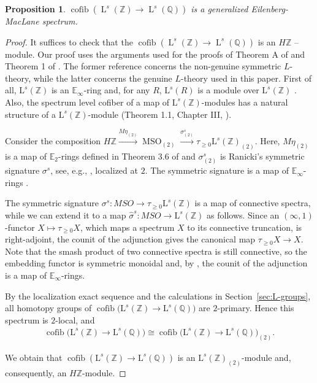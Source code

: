\documentclass[sn-mathphys-num]{sn-jnl}
\newtheorem{proposition}[lemma]{Proposition}
\theoremstyle{definition}
\numberwithin{equation}{section}
\theoremstyle{definition}
\def\L{{\mbox{L}}}
\def\IQ{\mathbb{Q}}
\def\IZ{{\mathbb{Z}}}
\def\bZ{\mathbb{Z}}
\begin{document}
\begin{proposition}\label{prob:GEM}
    $\operatorname{ cofib}( \operatorname{L}^s(\IZ)\rightarrow 
 \operatorname{L}^s(\IQ))$ is a generalized Eilenberg-MacLane spectrum.
\end{proposition}
\begin{proof}
    It suffices to check that the $\operatorname{ cofib}( \operatorname{L}^s(\IZ)\rightarrow 
 \operatorname{L}^s(\IQ))$ is an $H\bZ$ -- module. Our proof uses the arguments used for the proofs of Theorem A of \cite{TaylorWilliams} and Theorem 1 of \cite{land2022remark}. The former reference concerns the non-genuine symmetric $L$-theory, while the latter concerns the genuine $L$-theory used in this paper. First of all, $\L^{s}(\IZ)$ is an  $\mathbb E_{\infty}$-ring and, for any $R$, $\L^s(R)$ is a module over $\L^s(\IZ)$ \cite{Hebestreit_2020,land2022remark}.  Also, the spectrum level cofiber of a map of $\L^s(\bZ)$-modules has a natural structure of a $\L^s(\bZ)$-module (Theorem 1.1, Chapter III, \cite{elmendorf1997rings}). 
    
Consider the composition $H\IZ\xrightarrow{M\eta_{(2)}} \operatorname{MSO}_{(2)}\xrightarrow{\sigma^s_{(2)}} \tau_{\geqslant 0}\L^{s}(\IZ)_{(2)}$. Here, $M\eta_{(2)}$ is a map of $\mathbb E_2$-rings defined in
Theorem 3.6 of \cite{Hebestreit_2020} and $\sigma^s_{(2)}$ is
Ranicki's symmetric signature $\sigma^s$, see, e.g.,
\cite{ranicki1992algebraic}, localized at $2$. The symmetric signature is a map of $\mathbb E_{\infty}$-rings \cite{land2022remark}. 

The symmetric signature $\sigma^s:MSO\to \tau_{\geqslant 0}\L^s(\IZ)$ is a map of connective spectra, while we can extend it to a map $\hat\sigma^s:MSO\to \L^s(\IZ)$ as follows. Since an $(\infty,1)$-functor $X\mapsto \tau_{\geqslant 0}X$, which maps a spectrum $X$ to its connective truncation, is right-adjoint, the counit of the adjunction gives the canonical map $\tau_{\geqslant 0}X\to X$. Note that the smash product of two connective spectra is still connective, so the embedding functor is symmetric monoidal and, by \cite{lurie2017higher}, the counit of the adjunction is a map of $\mathbb E_\infty$-rings.

 By the localization exact sequence and the calculations in
Section~\ref{sec:L-groups}, all homotopy groups of
$\operatorname{cofib}
    \bigl(\L^s(\IZ)\longrightarrow\L^s(\IQ)\bigr)$
are $2$-primary. Hence this spectrum is $2$-local, and
\begin{align}
    \operatorname{cofib}
    \bigl(\L^s(\IZ)\longrightarrow\L^s(\IQ)\bigr)
    \cong
    \operatorname{cofib}
    \bigl(\L^s(\IZ)\longrightarrow\L^s(\IQ)\bigr)_{(2)}.
\end{align}

 We obtain that $\operatorname{ cofib}( \L^s(\IZ)\rightarrow 
 \L^s(\IQ))$ is an $\L^{s}(\IZ)_{(2)}$-module and, consequently, an $H\IZ$-module. 
\end{proof}
\vspace{3mm}
\end{document}
